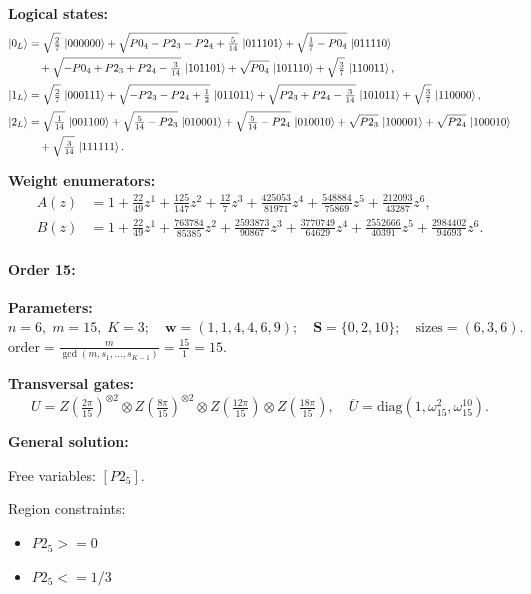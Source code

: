\documentclass[11pt]{article}
\begin{document}
\noindent\textbf{Logical states:}
\begin{align*}
\ket{0_L} &= \sqrt{\tfrac{2}{7}}\,\ket{000000} + \sqrt{P0_4 - P2_3 - P2_4 + \tfrac{5}{14}}\,\ket{011101} + \sqrt{\tfrac{1}{7} - P0_4}\,\ket{011110}\\
&\quad + \sqrt{-P0_4 + P2_3 + P2_4 - \tfrac{3}{14}}\,\ket{101101} + \sqrt{P0_4}\,\ket{101110} + \sqrt{\tfrac{3}{7}}\,\ket{110011},
\\[2pt]
\ket{1_L} &= \sqrt{\tfrac{2}{7}}\,\ket{000111} + \sqrt{-P2_3 - P2_4 + \tfrac{1}{2}}\,\ket{011011} + \sqrt{P2_3 + P2_4 - \tfrac{3}{14}}\,\ket{101011} + \sqrt{\tfrac{3}{7}}\,\ket{110000},
\\[2pt]
\ket{2_L} &= \sqrt{\tfrac{1}{14}}\,\ket{001100} + \sqrt{\tfrac{5}{14} - P2_3}\,\ket{010001} + \sqrt{\tfrac{5}{14} - P2_4}\,\ket{010010} + \sqrt{P2_3}\,\ket{100001} + \sqrt{P2_4}\,\ket{100010}\\
&\quad + \sqrt{\tfrac{3}{14}}\,\ket{111111}.
\end{align*}

\noindent\textbf{Weight enumerators:}
\begin{align*}
A(z) &= 1 + \tfrac{22}{49}z^{1} + \tfrac{125}{147}z^{2} + \tfrac{12}{7}z^{3} + \tfrac{425053}{81971}z^{4} + \tfrac{548884}{75869}z^{5} + \tfrac{212093}{43287}z^{6},\\[2pt]
B(z) &= 1 + \tfrac{22}{49}z^{1} + \tfrac{763784}{85385}z^{2} + \tfrac{2593873}{90867}z^{3} + \tfrac{3770749}{64629}z^{4} + \tfrac{2552666}{40391}z^{5} + \tfrac{2984402}{94693}z^{6}.
\end{align*}

\paragraph{\textbf{Order 15:}}
\noindent\textbf{Parameters:} $n=6,\; m=15,\; K=3;\quad \mathbf w=(1, 1, 4, 4, 6, 9);\quad \mathbf S=\{0, 2, 10\};\quad \text{sizes}=\left(6, 3, 6\right).$ $\displaystyle \text{order}=\frac{m}{\gcd(m,s_1,\dots,s_{K-1})}=\frac{15}{1}=15.$

\noindent\textbf{Transversal gates:}
\[
    U=Z \left(\tfrac{2\pi}{15}\right)^{\otimes2} \otimes Z \left(\tfrac{8\pi}{15}\right)^{\otimes2} \otimes Z \left(\tfrac{12\pi}{15}\right) \otimes Z \left(\tfrac{18\pi}{15}\right),\quad
    \overline U=\mathrm{diag}(1,\omega_{15}^{2},\omega_{15}^{10}).
\]

\noindent\textbf{General solution:}

Free variables: $[P2_5]$.

Region constraints:
\begin{itemize}
    \item $P2_5 >= 0$
    \item $P2_5 <= 1/3$
\end{itemize}
\end{document}
